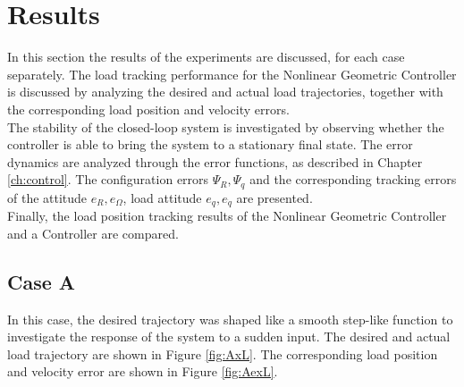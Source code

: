 \newpage
\section{Results}\label{sec:exp.results}
In this section the results of the experiments are discussed, for each case separately. 
The load tracking performance for the Nonlinear Geometric Controller is discussed by analyzing the desired and actual load trajectories,   
together with the corresponding load position and velocity errors.\\
The stability of the closed-loop system is investigated by observing whether the controller is able to bring the system to a stationary final state.
The error dynamics are analyzed through the error functions, as described in Chapter \ref{ch:control}. 
The configuration errors $ \Psi_R, \Psi_q $
and the corresponding tracking errors of the  attitude $ e_R, e_\Omega $, load attitude $ e_q, e_{\dot{q}} $ are presented.\\
Finally, the load position tracking results of the Nonlinear Geometric Controller and a  Controller are compared.

\subsection*{Case A}
In this case, the desired trajectory was shaped like a smooth step-like function to investigate the response of the system to a sudden input.
The desired and actual load trajectory are shown in Figure \ref{fig:AxL}.
The corresponding load position and velocity error are shown in Figure \ref{fig:AexL}.

